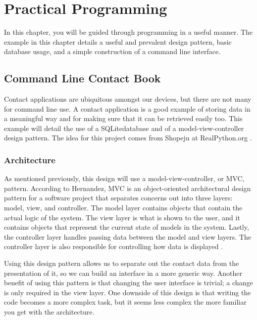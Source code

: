 \documentclass[12pt, oneside, a4paper]{book}
\begin{document}
   \chapter{Practical Programming}
   \label{chap:practical}
      In this chapter, you will be guided through programming in a useful manner.
      The example in this chapter details a useful and prevalent design pattern, basic database usage, and a simple construction of a command line interface.

      \section{Command Line Contact Book}
      Contact applications are ubiquitous amongst our devices, but there are not many for command line use.
      A contact application is a good example of storing data in a meaningful way and for making sure that it can be retrieved easily too.
      This example will detail the use of a SQLite\footnotemark database and of a model-view-controller design pattern.
      The idea for this project comes from Shopeju at RealPython.org \autocite{shopeju13ProjectIdeas}.


      \subsection{Architecture}
      As mentioned previously, this design will use a model-view-controller, or MVC, pattern.
      According to Hernandez, MVC is an object-oriented architectural design pattern for a software project that separates concerns out into three layers: model, view, and controller.
      The model layer contains objects that contain the actual logic of the system.
      The view layer is what is shown to the user, and it contains objects that represent the current state of models in the system.
      Lastly, the controller layer handles passing data between the model and view layers.
      The controller layer is also responsible for controlling how data is displayed \autocite{hernandezModelViewController2021}.

      Using this design pattern allows us to separate out the contact data from the presentation of it, so we can build an interface in a more generic way.
      Another benefit of using this pattern is that changing the user interface is trivial; a change is only required in the view layer.
      One downside of this design is that writing the code becomes a more complex task, but it seems less complex the more familiar you get with the architecture.
\end{document}
